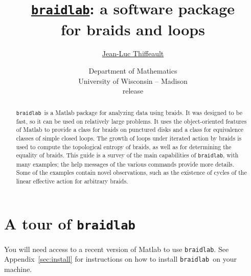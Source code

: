 \documentclass[12pt]{article}
\newcommand{\braidlab}{\texttt{braidlab}}%
\begin{document}
\lstset{language=Matlab}
\lstset{breaklines=true}

\lstset{%
basicstyle=\small\ttfamily,
keywordstyle=\small\ttfamily,
identifierstyle=,
commentstyle=\small\rmfamily\itshape,%
stringstyle=\small\ttfamily,
showstringspaces=false}


\title{\href{{http://github.com/jeanluct/braidlab}}{\braidlab}:
  a software package \\ for braids and loops}
\author{\href{http://www.math.wisc.edu/~jeanluc}{Jean-Luc Thiffeault}}
\date{{\small Department of Mathematics\\ University of
    Wisconsin -- Madison} \\[10pt]
  release } %

\maketitle

\begin{abstract}
  \braidlab\ is a Matlab package for analyzing data using braids.  It was
  designed to be fast, so it can be used on relatively large problems.  It
  uses the object-oriented features of Matlab to provide a class for braids on
  punctured disks and a class for equivalence classes of simple closed loops.
  The growth of loops under iterated action by braids is used to compute the
  topological entropy of braids, as well as for determining the equality of
  braids.  This guide is a survey of the main capabilities of \braidlab, with
  many examples; the help messages of the various commands provide more
  details.  Some of the examples contain novel observations, such as the
  existence of cycles of the linear effective action for arbitrary braids.
\end{abstract}

\tableofcontents


\section{A tour of \braidlab}
\label{sec:tour}

You will need access to a recent version of Matlab to use \braidlab.  See
Appendix~\ref{sec:install} for instructions on how to install \braidlab\ on
your machine.
\end{document}
